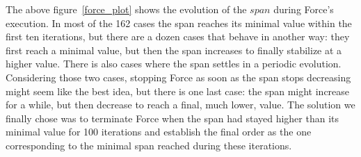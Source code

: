 \documentclass[12pt]{report}
\begin{document}
The above figure~\ref{force_plot} shows the evolution of the $span$ during Force's execution. In most of the 162 cases the span reaches its minimal value within the first ten iterations, but there are a dozen cases that behave in another way: they first reach a minimal value, but then the span increases to finally stabilize at a higher value. There is also cases where the span settles in a periodic evolution. Considering those two cases, stopping Force as soon as the span stops decreasing might seem like the best idea, but there is one last case: the span might increase for a while, but then decrease to reach a final, much lower, value.
The solution we finally chose was to terminate Force when the span had stayed higher than its minimal value for 100 iterations and establish the final order as the one corresponding to the minimal span reached during these iterations.
\end{document}
